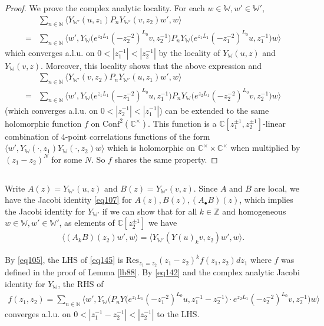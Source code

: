 \documentclass[12pt,a4paper,notitlepage]{article}
\theoremstyle{definition}
\theoremstyle{plain}
\newcommand{\Conf}{\mathrm{Conf}}
\newcommand{\Res}{\mathrm{Res}}
\newcommand{\bk}[1]{\langle {#1}\rangle}
\newcommand{\bigbk}[1]{\big\langle {#1}\big\rangle}
\newcommand{\blt}{\bullet}
\newcommand{\Wbb}{\mathbb W}
\newcommand{\Cbb}{\mathbb C}
\newcommand{\Nbb}{\mathbb N}
\newcommand{\Zbb}{\mathbb Z}
\numberwithin{equation}{section}
\begin{document}
\begin{proof}
We prove the complex analytic locality. For each $w\in\Wbb,w'\in\Wbb'$,
\begin{align}
&\sum_{n\in\Nbb}\bigbk{Y_{\Wbb'}(u,z_1)P_nY_{\Wbb'}(v,z_2)w',w}\\
=&\sum_{n\in\Nbb}\bigbk{w',Y_\Wbb\big(e^{z_2L_1}(-z_2^{-2})^{L_0}v,z_2^{-1}\big)P_nY_\Wbb\big(e^{z_1L_1}(-z_1^{-2})^{L_0}u,z_1^{-1}\big)w}
\end{align}
which converges a.l.u. on $0<|z_1^{-1}|<|z_2^{-1}|$ by the locality of $Y_{\Wbb}(u,z)$ and $Y_{\Wbb}(v,z)$. Moreover, this locality shows that the above expression and 
\begin{align}
&\sum_{n\in\Nbb}\bigbk{Y_{\Wbb'}(v,z_2)P_nY_{\Wbb'}(u,z_1)w',w}\\
=&\sum_{n\in\Nbb}\bigbk{w',Y_\Wbb\big(e^{z_1L_1}(-z_1^{-2})^{L_0}u,z_1^{-1}\big)P_n Y_\Wbb\big(e^{z_2L_1}(-z_2^{-2})^{L_0}v,z_2^{-1}\big)w}\label{eq142}
\end{align}
(which converges a.l.u. on $0<|z_2^{-1}|<|z_1^{-1}|$) can be extended to the same holomorphic function $f$ on $\Conf^2(\Cbb^\times)$. This function is a $\Cbb[z_1^{\pm1},z_2^{\pm1}]$-linear combination of $4$-point correlations functions of the form $\bk{w',Y_\Wbb(\cdot,z_1)Y_{\Wbb}(\cdot,z_2)w}$ which is holomorphic on $\Cbb^\times\times\Cbb^\times$ when multiplied by $(z_1-z_2)^N$ for some $N$. So $f$ shares the same property. 
\end{proof}




\subsection{}

Write $A(z)=Y_{\Wbb'}(u,z)$ and $B(z)=Y_{\Wbb'}(v,z)$. Since $A$ and $B$ are local,  we have the Jacobi identity \eqref{eq107} for $A(z),B(z),(A_\blt B)(z)$, which implies the Jacobi identity for $Y_{\Wbb'}$ if we can show that for all $k\in\Zbb$ and homogeneous $w\in\Wbb,w'\in\Wbb'$, as elements of $\Cbb[z_2^{\pm1}]$ we have
\begin{align}
\bigbk{(A_kB)(z_2)w',w}=\bigbk{Y_{\Wbb'}(Y(u)_kv,z_2)w',w}.	\label{eq145}
\end{align}


By \eqref{eq105}, the LHS of \eqref{eq145} is $\Res_{z_1=z_2}(z_1-z_2)^kf(z_1,z_2)dz_1$ where $f$ was defined in the proof of Lemma \ref{lb88}. By \eqref{eq142} and the complex analytic Jacobi identity for $Y_\Wbb$,  the RHS of
\begin{align}
f(z_1,z_2)=	\sum_{n\in\Nbb}\bigbk{w', Y_\Wbb\big(P_nY\big(e^{z_1L_1}(-z_1^{-2})^{L_0}u,z_1^{-1}-z_2^{-1}\big)\cdot e^{z_2L_1}(-z_2^{-2})^{L_0}v,z_2^{-1}\big)w}\label{eq143}
\end{align}
converges a.l.u. on $0<|z_1^{-1}-z_2^{-1}|<|z_2^{-1}|$ to the LHS. 
\end{document}
